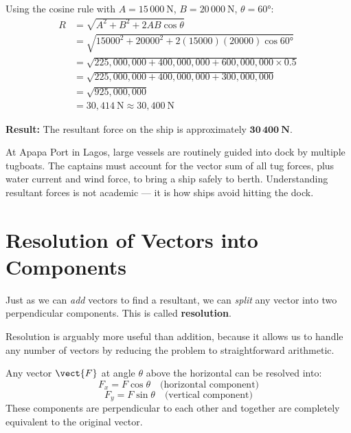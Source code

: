 \begin{solutionbox}
Using the cosine rule with $A = 15\,000\ \text{N}$,
$B = 20\,000\ \text{N}$, $\theta = 60°$:
\begin{align*}
  R &= \sqrt{A^2 + B^2 + 2AB\cos\theta}\\[4pt]
  &= \sqrt{15000^2 + 20000^2
    + 2(15000)(20000)\cos 60°}\\[4pt]
  &= \sqrt{225{,}000{,}000 + 400{,}000{,}000
    + 600{,}000{,}000 \times 0.5}\\[4pt]
  &= \sqrt{225{,}000{,}000 + 400{,}000{,}000
    + 300{,}000{,}000}\\[4pt]
  &= \sqrt{925{,}000{,}000}\\[4pt]
  &= 30{,}414\ \text{N} \approx 30{,}400\ \text{N}
\end{align*}

\textbf{Result:} The resultant force on the ship is
approximately $\mathbf{30\,400\ \text{N}}$.

\begin{realworldbox}
At Apapa Port in Lagos, large vessels are routinely guided
into dock by multiple tugboats. The captains must account
for the vector sum of all tug forces, plus water current
and wind force, to bring a ship safely to berth.
Understanding resultant forces is not academic --- it
is how ships avoid hitting the dock.
\end{realworldbox}
\end{solutionbox}

\section{Resolution of Vectors into Components}

Just as we can \textit{add} vectors to find a resultant,
we can \textit{split} any vector into two perpendicular
components. This is called \textbf{resolution}.

Resolution is arguably more useful than addition, because
it allows us to handle any number of vectors by reducing
the problem to straightforward arithmetic.

\begin{lawbox}
Any vector $\vect{F}$ at angle $\theta$ above the
horizontal can be resolved into:
\[
  F_x = F\cos\theta \quad \text{(horizontal component)}
\]
\[
  F_y = F\sin\theta \quad \text{(vertical component)}
\]
These components are perpendicular to each other and
together are completely equivalent to the original vector.
\end{lawbox}

